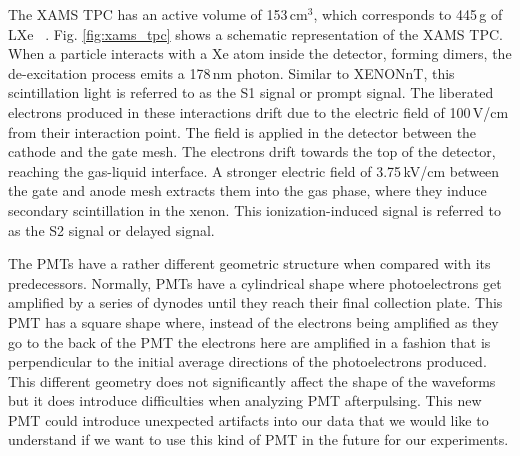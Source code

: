 
The XAMS TPC has an active volume of 153\,cm$^3$, which corresponds to 445\,g of LXe~\cite{HOGENBIRK201687} .  Fig. \ref{fig:xams_tpc} shows a schematic representation of the XAMS TPC. When a particle interacts with a Xe atom inside the detector, forming dimers, the de-excitation process emits a 178\,nm photon. Similar to XENONnT, this scintillation light is referred to as the S1 signal or prompt signal. The liberated electrons produced in these interactions drift due to the  electric field of 100\,V/cm from their interaction point. The field is applied in the detector between the cathode and the gate mesh. The electrons drift towards the top of the detector, reaching the gas-liquid interface. A stronger electric field of 3.75\,kV/cm between the gate and anode mesh extracts them into the gas phase, where they induce secondary scintillation in the xenon. This ionization-induced signal is referred to as the S2 signal or delayed signal. 

The PMTs have a rather different geometric structure when compared with its predecessors. Normally, PMTs have a cylindrical shape where photoelectrons get amplified by a series of dynodes until they reach their final collection plate. This PMT has a square shape where, instead of the electrons being amplified as they go to the back of the PMT the electrons here are amplified in a fashion that is perpendicular to the initial average directions of the photoelectrons produced. This different geometry does not significantly affect the shape of the waveforms but it does introduce difficulties when analyzing PMT afterpulsing. This new PMT could introduce unexpected artifacts into our data that we would like to understand if we want to use this kind of PMT in the future for our experiments.

